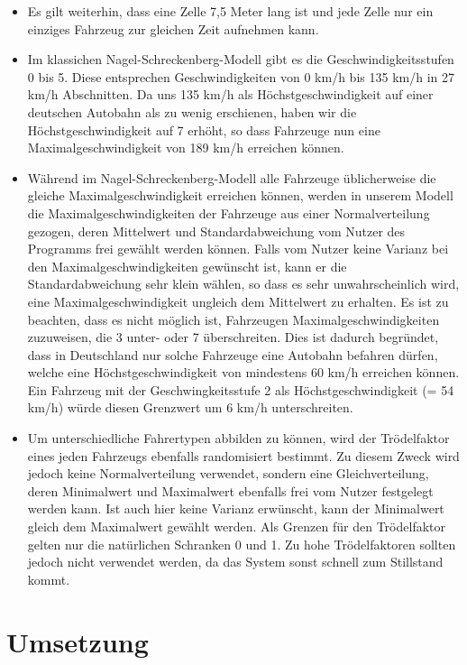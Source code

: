 \documentclass[11pt, a4paper]{article}
\newcommand\nsm{Nagel-Schreckenberg-Modell }
\begin{document}
\begin{itemize}
\item Es gilt weiterhin, dass eine Zelle 7,5 Meter lang ist und jede Zelle nur ein einziges Fahrzeug zur gleichen Zeit aufnehmen kann.
\item Im klassichen \nsm gibt es die Geschwindigkeitsstufen 0 bis 5. Diese entsprechen Geschwindigkeiten von 0 km/h bis 135 km/h in 27 km/h Abschnitten. Da uns 135 km/h als Höchstgeschwindigkeit auf einer deutschen Autobahn als zu wenig erschienen, haben wir die Höchstgeschwindigkeit auf 7 erhöht, so dass Fahrzeuge nun eine Maximalgeschwindigkeit von 189 km/h erreichen können.
\item Während im \nsm alle Fahrzeuge üblicherweise die gleiche Maximalgeschwindigkeit erreichen können, werden in unserem Modell die Maximalgeschwindigkeiten der Fahrzeuge aus einer Normalverteilung gezogen, deren Mittelwert und Standardabweichung vom Nutzer des Programms frei gewählt werden können. Falls vom Nutzer keine Varianz bei den Maximalgeschwindigkeiten gewünscht ist, kann er die Standardabweichung sehr klein wählen, so dass es sehr unwahrscheinlich wird, eine Maximalgeschwindigkeit ungleich dem Mittelwert zu erhalten. Es ist zu beachten, dass es nicht möglich ist, Fahrzeugen Maximalgeschwindigkeiten zuzuweisen, die 3 unter- oder 7 überschreiten. Dies ist dadurch begründet, dass in Deutschland nur solche Fahrzeuge eine Autobahn befahren dürfen, welche eine Höchstgeschwindigkeit von mindestens 60 km/h erreichen können. Ein Fahrzeug mit der Geschwingkeitsstufe 2 als Höchstgeschwindigkeit (= 54 km/h) würde diesen Grenzwert um 6 km/h unterschreiten.
\item Um unterschiedliche Fahrertypen abbilden zu können, wird der Trödelfaktor eines jeden Fahrzeugs ebenfalls randomisiert bestimmt. Zu diesem Zweck wird jedoch keine Normalverteilung verwendet, sondern eine Gleichverteilung, deren Minimalwert und Maximalwert ebenfalls frei vom Nutzer festgelegt werden kann. Ist auch hier keine Varianz erwünscht, kann der Minimalwert gleich dem Maximalwert gewählt werden. Als Grenzen für den Trödelfaktor gelten nur die natürlichen Schranken 0 und 1. Zu hohe Trödelfaktoren sollten jedoch nicht verwendet werden, da das System sonst schnell zum Stillstand kommt.
\end{itemize}

\newpage
\section{Umsetzung}
\label{sec:umsetzung}
\end{document}
